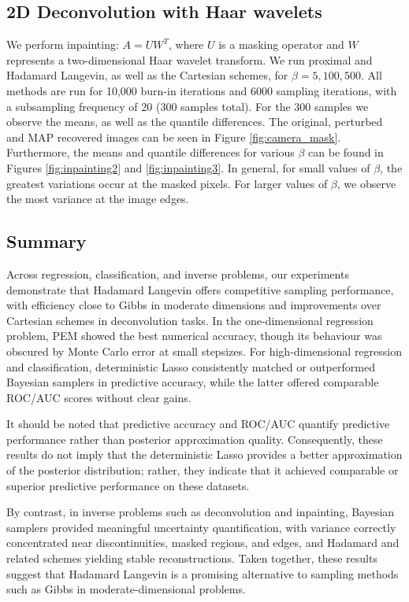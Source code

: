 \documentclass[11pt, twoside]{report}
\begin{document}
\subsection{2D Deconvolution with Haar wavelets}
We perform inpainting: $A = UW^T$, where $U$ is a masking operator and $W$ represents a two-dimensional Haar wavelet transform. We run proximal and Hadamard Langevin, as well as the Cartesian schemes, for $\beta = 5,100,500$. All methods are run for 10,000 burn-in iterations and 6000 sampling iterations, with a subsampling frequency of 20 (300 samples total). For the 300 samples we observe the means, as well as the quantile differences. The original, perturbed and MAP recovered images can be seen in Figure \ref{fig:camera_mask}. Furthermore, the means and quantile differences for various $\beta$ can be found in Figures \ref{fig:inpainting2} and \ref{fig:inpainting3}. In general, for small values of $\beta$, the greatest variations occur at the masked pixels. For larger values of $\beta$, we observe the most variance at the image edges.
\subsection{Summary}
Across regression, classification, and inverse problems, our experiments demonstrate that Hadamard Langevin offers competitive sampling performance, with efficiency close to Gibbs in moderate dimensions and improvements over Cartesian schemes in deconvolution tasks. In the one-dimensional regression problem, PEM showed the best numerical accuracy, though its behaviour was obscured by Monte Carlo error at small stepsizes. For high-dimensional regression and classification, deterministic Lasso consistently matched or outperformed Bayesian samplers in predictive accuracy, while the latter offered comparable ROC/AUC scores without clear gains.

It should be noted that predictive accuracy and ROC/AUC quantify predictive
performance rather than posterior approximation quality. Consequently, these
results do not imply that the deterministic Lasso provides a better
approximation of the posterior distribution; rather, they indicate that it
achieved comparable or superior predictive performance on these datasets.

By contrast, in inverse problems such as deconvolution and inpainting, Bayesian samplers provided meaningful uncertainty quantification, with variance correctly concentrated near discontinuities, masked regions, and edges, and Hadamard and related schemes yielding stable reconstructions. Taken together, these results suggest that Hadamard Langevin is a promising alternative to sampling methods such as Gibbs in moderate-dimensional problems.
\end{document}
